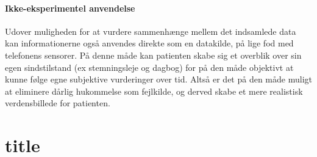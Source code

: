 \paragraph{Ikke-eksperimentel anvendelse}
Udover muligheden for at vurdere sammenhænge mellem det indsamlede data kan informationerne også anvendes direkte som en datakilde, på lige fod med telefonens sensorer.
På denne måde kan patienten skabe sig et overblik over sin egen sindstilstand (ex stemningsleje og dagbog) for på den måde objektivt at kunne følge egne subjektive vurderinger over tid.
Altså er det på den måde muligt at eliminere dårlig hukommelse som fejlkilde, og derved skabe et mere realistisk verdensbillede for patienten.

\section{title}
